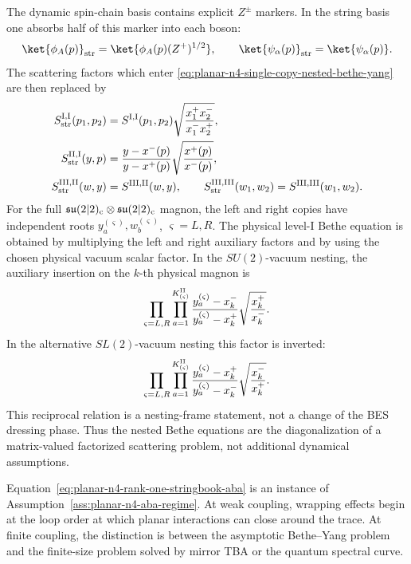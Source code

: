 The dynamic spin-chain basis contains explicit \(Z^\pm\) markers.  In the
string basis one absorbs half of this marker into each boson:
\[
  \ket{\phi_A(p)}_{\rm str}=\ket{\phi_A(p)(Z^+)^{1/2}},
  \qquad
  \ket{\psi_\alpha(p)}_{\rm str}=\ket{\psi_\alpha(p)} .
\]
The scattering factors which enter
\eqref{eq:planar-n4-single-copy-nested-bethe-yang} are then replaced by
\begin{equation}
\begin{aligned}
  S^{{\rm I},{\rm I}}_{\rm str}(p_1,p_2)
  &=
  S^{{\rm I},{\rm I}}(p_1,p_2)
  \sqrt{\frac{x_1^+x_2^-}{x_1^-x_2^+}},\\
  S^{{\rm II},{\rm I}}_{\rm str}(y,p)
  &=
  \frac{y-x^-(p)}{y-x^+(p)}
  \sqrt{\frac{x^+(p)}{x^-(p)}},\\
  S^{{\rm III},{\rm II}}_{\rm str}(w,y)
  &=
  S^{{\rm III},{\rm II}}(w,y),
  \qquad
  S^{{\rm III},{\rm III}}_{\rm str}(w_1,w_2)
  =
  S^{{\rm III},{\rm III}}(w_1,w_2).
\end{aligned}
  \label{eq:planar-n4-string-basis-nesting-factors}
\end{equation}
For the full \(\mathfrak{su}(2|2)_{\rm c}\otimes
\mathfrak{su}(2|2)_{\rm c}\) magnon, the left and right copies have
independent roots \(y_a^{(\varsigma)},w_b^{(\varsigma)}\),
\(\varsigma=L,R\).  The physical level-I Bethe equation is obtained by
multiplying the left and right auxiliary factors and by using the chosen
physical vacuum scalar factor.  In the \(SU(2)\)-vacuum nesting, the
auxiliary insertion on the \(k\)-th physical magnon is
\[
  \prod_{\varsigma=L,R}\prod_{a=1}^{K^{\rm II}_{(\varsigma)}}
  \frac{y_a^{(\varsigma)}-x_k^-}{y_a^{(\varsigma)}-x_k^+}
  \sqrt{\frac{x_k^+}{x_k^-}}.
\]
In the alternative \(SL(2)\)-vacuum nesting this factor is inverted:
\[
  \prod_{\varsigma=L,R}\prod_{a=1}^{K^{\rm II}_{(\varsigma)}}
  \frac{y_a^{(\varsigma)}-x_k^+}{y_a^{(\varsigma)}-x_k^-}
  \sqrt{\frac{x_k^-}{x_k^+}}.
\]
This reciprocal relation is a nesting-frame statement, not a change of the
BES dressing phase.  Thus the nested Bethe equations are the
diagonalization of a matrix-valued factorized scattering problem, not
additional dynamical assumptions.

\begin{controlledapproximation}
\label{ca:planar-n4-asymptotic-regime}
Equation~\eqref{eq:planar-n4-rank-one-stringbook-aba} is an instance of
Assumption~\ref{ass:planar-n4-aba-regime}.  At weak coupling, wrapping
effects begin at the loop order at which planar interactions can close around
the trace.  At finite coupling, the distinction is between the asymptotic
Bethe--Yang problem and the finite-size problem solved by mirror TBA or the
quantum spectral curve.
\end{controlledapproximation}

